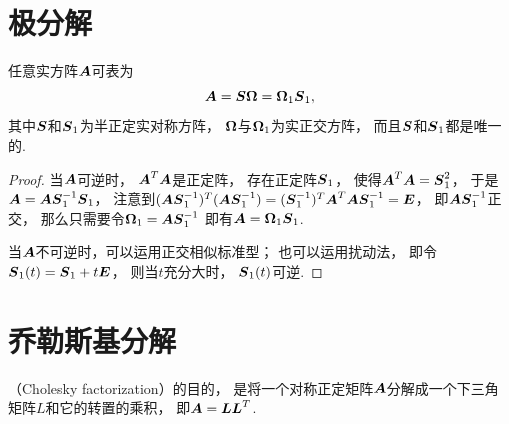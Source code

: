 \section{极分解}
\begin{theorem}
任意实方阵\(\boldsymbol{A}\)可表为\begin{equation*}
	\boldsymbol{A} = \boldsymbol{S}\boldsymbol\Omega = \boldsymbol\Omega_1 \boldsymbol{S}_1,
\end{equation*}
其中\(\boldsymbol{S}\)和\(\boldsymbol{S}_1\)为半正定实对称方阵，
\(\boldsymbol\Omega\)与\(\boldsymbol\Omega_1\)为实正交方阵，
而且\(\boldsymbol{S}\)和\(\boldsymbol{S}_1\)都是唯一的.
\begin{proof}
当\(\boldsymbol{A}\)可逆时，
\(\boldsymbol{A}^T \boldsymbol{A}\)是正定阵，
存在正定阵\(\boldsymbol{S}_1\)，
使得\(\boldsymbol{A}^T \boldsymbol{A} = \boldsymbol{S}_1^2\)，
于是\(\boldsymbol{A} = \boldsymbol{A} \boldsymbol{S}_1^{-1} \boldsymbol{S}_1\)，
注意到\((\boldsymbol{A} \boldsymbol{S}_1^{-1})^T (\boldsymbol{A} \boldsymbol{S}_1^{-1})
= (\boldsymbol{S}_1^{-1})^T \boldsymbol{A}^T \boldsymbol{A} \boldsymbol{S}_1^{-1} = \boldsymbol{E}\)，
即\(\boldsymbol{A} \boldsymbol{S}_1^{-1}\)正交，
那么只需要令\(\boldsymbol\Omega_1 = \boldsymbol{A} \boldsymbol{S}_1^{-1}\)
即有\(\boldsymbol{A} = \boldsymbol\Omega_1 \boldsymbol{S}_1\).

当\(\boldsymbol{A}\)不可逆时，可以运用正交相似标准型；
也可以运用扰动法，
即令\(\boldsymbol{S}_1(t) = \boldsymbol{S}_1 + t\boldsymbol{E}\)，
则当\(t\)充分大时，
\(\boldsymbol{S}_1(t)\)可逆.
\end{proof}
\end{theorem}


\section{乔勒斯基分解}
（Cholesky factorization）的目的，
是将一个对称正定矩阵\(\boldsymbol{A}\)分解成一个下三角矩阵\(L\)和它的转置的乘积，
即\(\boldsymbol{A} = \boldsymbol{L} \boldsymbol{L}^T\).

